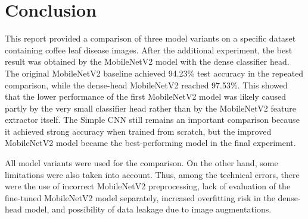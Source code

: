 \section{Conclusion}

This report provided a comparison of three model variants on a specific dataset
containing coffee leaf disease images. After the additional experiment, the best result
was obtained by the MobileNetV2 model with the dense classifier head. The original
MobileNetV2 baseline achieved 94.23\% test accuracy in the repeated comparison, while
the dense-head MobileNetV2 reached 97.53\%. This showed that the lower performance of
the first MobileNetV2 model was likely caused partly by the very small classifier head
rather than by the MobileNetV2 feature extractor itself. The Simple CNN still remains an
important comparison because it achieved strong accuracy when trained from scratch, but
the improved MobileNetV2 model became the best-performing model in the final experiment.

All model variants were used for the comparison. On the other hand, some limitations
were also taken into account. Thus, among the technical errors, there were the use of
incorrect MobileNetV2 preprocessing, lack of evaluation of the fine-tuned MobileNetV2
model separately, increased overfitting risk in the dense-head model, and possibility of
data leakage due to image augmentations.
